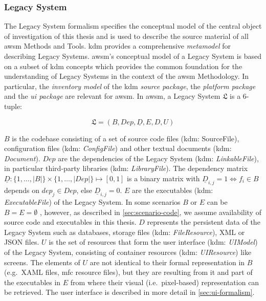 \subsubsection*{\gls{Legacy System}}
The \gls{Legacy System} formalism specifies the conceptual model of the central object of investigation of this thesis and is used to describe the source material of all \gls{awsm} Methods and Tools.
\gls{kdm} \autocite{OMG2016KDM} provides a comprehensive \emph{\gls{metamodel}} for describing \glspl{Legacy System}.
\gls{awsm}'s conceptual model of a \gls{Legacy System} is based on a subset of \gls{kdm} concepts which provides the common foundation for the understanding of \glspl{Legacy System} in the context of the \gls{awsm} Methodology.
In particular, the \emph{inventory model} of the \gls{kdm} \emph{source package}, the \emph{platform package} and the \emph{\gls{ui} package} are relevant for \gls{awsm}.
In \gls{awsm}, a \gls{Legacy System} \(\mathfrak{L}\) is a 6-tuple:

\begin{equation}\mathfrak{L} = (B, Dep, \underline D,  E, D, U)\label{eq:legacy-system}\end{equation}

\(B\) is the  codebase consisting of a set of source code files (\gls{kdm}: SourceFile), configuration files (\gls{kdm}: \emph{ConfigFile}) and other textual documents (\gls{kdm}: \emph{Document}).
\(Dep\) are the dependencies of the \gls{Legacy System} (\gls{kdm}: \emph{LinkableFile}), in particular third-party libraries (\gls{kdm}: \emph{LibraryFile}).
The dependency matrix \(\underline D: \{1,\ldots, |B|\} \times \{1,\ldots, |Dep|\} \mapsto [0,1]\) is a binary matrix with \(\underline D_{i,j} = 1 \Longleftrightarrow f_i \in B\) depends on \(dep_j \in Dep\), else \(\underline D_{i,j} = 0\).
\(E\) are the executables (\gls{kdm}: \emph{ExecutableFile}) of the \gls{Legacy System}.
In some scenarios \(B\) or \(E\) can be \(B=E=\emptyset\) \autocite{Binkley2007b}, however, as described in \cref{sec:scenario-code}, we assume availability of source code and executables in this thesis.
\(D\) represents the persistent data of the \gls{Legacy System} such as databases, storage files (\gls{kdm}: \emph{FileResource}), XML or JSON files.
\(U\) is the set of resources that form the user interface (\gls{kdm}: \emph{UIModel}) of the \gls{Legacy System}, consisting of container resources (\gls{kdm}: \emph{UIResource}) like screens.
The elements of \(U\) are not identical to their formal representation in \(B\) (e.g.~XAML files, \gls{mfc} resource files), but they are resulting from it and part of the executables in \(E\) from where their visual (i.e.~pixel-based) representation can be retrieved.
The  user interface is described in more detail in \cref{sec:ui-formalism}.


